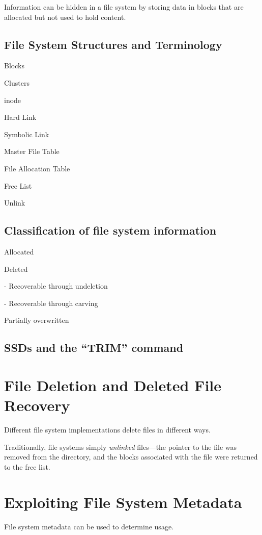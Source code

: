 \documentclass[11pt,letter]{article}
\begin{document}
Information can be hidden in a file system by storing data in blocks
that are allocated but not used to hold content\cite{dfrws2005:KnutEcksteinAndMarkoJahnke}. 

\subsection{File System Structures and Terminology}

Blocks

Clusters

inode

Hard Link

Symbolic Link

Master File Table

File Allocation Table

Free List

Unlink

\subsection{Classification of file system information}

Allocated

Deleted

 - Recoverable through undeletion

 - Recoverable through carving

Partially overwritten

\subsection{SSDs and the ``TRIM'' command}
\cite{dfrws2011:TimothyVidasAndChengyeZhangAndNicolasChristin}


\section{File Deletion and Deleted File Recovery}\label{deleted_file_recovery}
Different file system implementations delete files in different ways.

Traditionally, file systems simply \emph{unlinked} files---the pointer
to the file was removed from the directory, and the blocks associated
with the file were returned to the free list.


\section{Exploiting File System Metadata}
File system metadata can be used to determine usage. 
\cite{dfrws2011:JonathanGrier}
\end{document}

